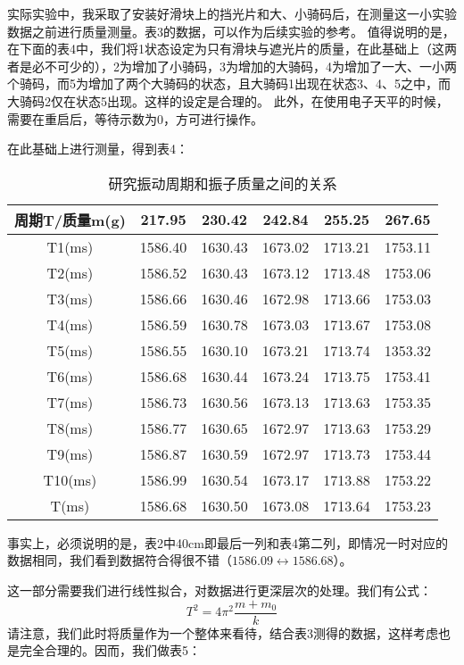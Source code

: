 \documentclass[11pt]{article}
\begin{document}
实际实验中，我采取了安装好滑块上的挡光片和大、小骑码后，在测量这一小实验数据之前进行质量测量。表3的数据，可以作为后续实验的参考。
值得说明的是，在下面的表4中，我们将1状态设定为只有滑块与遮光片的质量，在此基础上（这两者是必不可少的），2为增加了小骑码，3为增加的大骑码，4为增加了一大、一小两个骑码，而5为增加了两个大骑码的状态，且大骑码1出现在状态3、4、5之中，而大骑码2仅在状态5出现。这样的设定是合理的。
此外，在使用电子天平的时候，需要在重启后，等待示数为0，方可进行操作。

在此基础上进行测量，得到表4：

\begin{table}[htbp]
    \centering
    \begin{tabular}{|c|c|c|c|c|c|}
    \hline
    周期T/质量m(g) & 217.95  & 230.42  & 242.84  & 255.25  & 267.65  \\ \hline
    T1(ms)     & 1586.40 & 1630.43 & 1673.02 & 1713.21 & 1753.11 \\ \hline
    T2(ms)     & 1586.52 & 1630.43 & 1673.12 & 1713.48 & 1753.06 \\ \hline
    T3(ms)     & 1586.66 & 1630.46 & 1672.98 & 1713.66 & 1753.03 \\ \hline
    T4(ms)     & 1586.59 & 1630.78 & 1673.03 & 1713.67 & 1753.08 \\ \hline
    T5(ms)     & 1586.55 & 1630.10 & 1673.21 & 1713.74 & 1353.32 \\ \hline
    T6(ms)     & 1586.68 & 1630.44 & 1673.24 & 1713.75 & 1753.41 \\ \hline
    T7(ms)     & 1586.73 & 1630.56 & 1673.13 & 1713.63 & 1753.35 \\ \hline
    T8(ms)     & 1586.77 & 1630.65 & 1672.97 & 1713.63 & 1753.29 \\ \hline
    T9(ms)     & 1586.87 & 1630.59 & 1672.97 & 1713.73 & 1753.44 \\ \hline
    T10(ms)    & 1586.99 & 1630.54 & 1673.17 & 1713.88 & 1753.22 \\ \hline
    T(ms)      & 1586.68 & 1630.50 & 1673.08 & 1713.64 & 1753.23 \\ \hline
    \end{tabular}   
\caption{研究振动周期和振子质量之间的关系}
\end{table}

事实上，必须说明的是，表2中40cm即最后一列和表4第二列，即情况一时对应的数据相同，我们看到数据符合得很不错（$1586.09\leftrightarrow 1586.68$）。

这一部分需要我们进行线性拟合，对数据进行更深层次的处理。我们有公式：\begin{displaymath}T^2=4\pi^2 \frac{m+m_0}{k}\end{displaymath}
请注意，我们此时将质量作为一个整体来看待，结合表3测得的数据，这样考虑也是完全合理的。因而，我们做表5：
\end{document}
